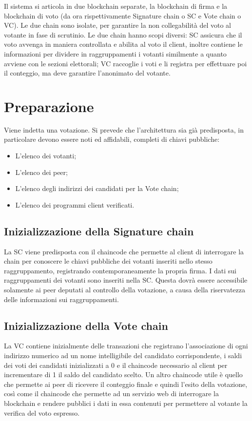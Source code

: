 Il sistema si articola in due blockchain separate, la blockchain di firma e la blockchain di voto (da ora rispettivamente Signature chain o SC e Vote chain o VC). Le due chain sono isolate, per garantire la non collegabilità del voto al votante in fase di scrutinio.
Le due chain hanno scopi diversi: SC assicura che il voto avvenga in maniera controllata e abilita al voto il client, inoltre contiene le informazioni per dividere in raggruppamenti i votanti similmente a quanto avviene con le sezioni elettorali; VC raccoglie i voti e li registra per effettuare poi il conteggio, ma deve garantire l’anonimato del votante.

\section{Preparazione}
	Viene indetta una votazione. Si prevede che l'architettura sia già predisposta, in particolare devono essere noti ed affidabili, completi di chiavi pubbliche:
	\begin{itemize}
		\item L'elenco dei votanti;
		\item L'elenco dei peer;
		\item L'elenco degli indirizzi dei candidati per la Vote chain;
		\item L'elenco dei programmi client verificati.
	\end{itemize}
	\subsection{Inizializzazione della Signature chain}
		La SC viene predisposta con il chaincode che permette al client di interrogare la chain per conoscere le chiavi pubbliche dei votanti inseriti nello stesso raggruppamento, registrando contemporaneamente la propria firma. I dati sui raggruppamenti dei votanti sono inseriti nella SC. Questa dovrà essere accessibile solamente ai peer deputati al controllo della votazione, a causa della riservatezza delle informazioni sui raggruppamenti.
	\subsection{Inizializzazione della Vote chain}
		La VC contiene inizialmente delle transazioni che registrano l'associazione di ogni indirizzo numerico ad un nome intelligibile del candidato corrispondente, i saldi dei voti dei candidati inizializzati a 0 e il chaincode necessario al client per incrementare di 1 il saldo del candidato scelto. Un altro chaincode utile è quello che permette ai peer di ricevere il conteggio finale e quindi l'esito della votazione, così come il chaincode che permette ad un servizio web di interrogare la blockchain e rendere pubblici i dati in essa contenuti per permettere al votante la verifica del voto espresso.

